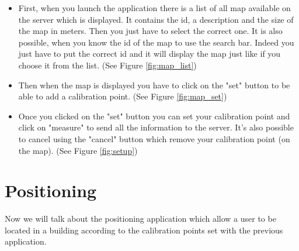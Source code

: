 \begin{itemize}
\item First, when you launch the application there is a list of all map available on the server which is displayed. It contains the id, a description and the size of the map in meters. Then you just have to select the correct one. It is also possible, when you know the id of the map to use the search bar. Indeed you just have to put the correct id and it will display the map just like if you choose it from the list. (See Figure \ref{fig:map_list})
\item Then when the map is displayed you have to click on the "set" button to be able to add a calibration point. (See Figure \ref{fig:map_set})
\item Once you clicked on the "set" button you can set your calibration point and click on "measure" to send all the information to the server. It's also possible to cancel using the "cancel" button which remove your calibration point (on the map). (See Figure \ref{fig:setup})
\end{itemize}

\section{Positioning}
Now we will talk about the positioning application which allow a user to be located in a building according to the calibration points set with the previous application.

